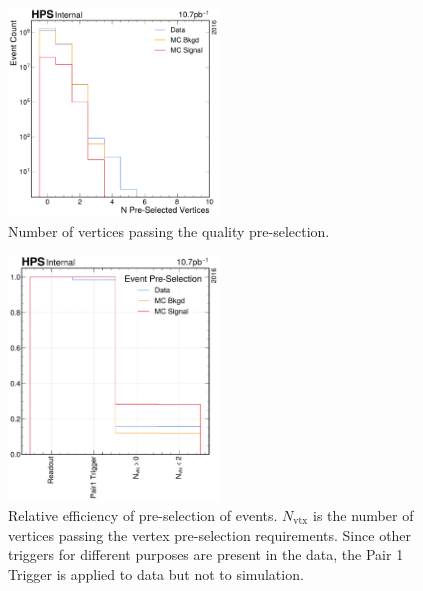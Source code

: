 \begin{figure}
  \centering
  \includegraphics[width=0.5\textwidth]{figures/hps/dataset/n-pre-selected-vertices.pdf}
  \caption{Number of vertices passing the quality pre-selection.}
  \label{fig:n-vertex-pre-selection}
\end{figure}

\begin{figure}
  \centering
  \includegraphics[width=0.5\textwidth]{figures/hps/dataset/event-pre-selection-efficiency.pdf}
  \caption{Relative efficiency of pre-selection of events.
  $N_\mathrm{vtx}$ is the number of vertices passing the vertex pre-selection requirements.
  Since other triggers for different purposes are present in the data, the Pair 1 Trigger
  is applied to data but not to simulation.}
  \label{fig:event-pre-selection}
\end{figure}

